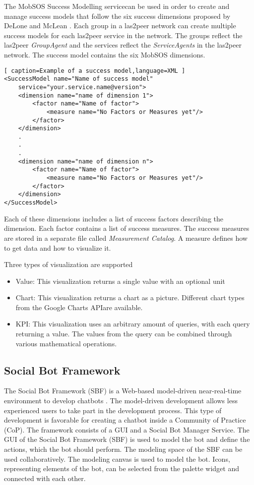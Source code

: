 The MobSOS Success Modelling service\footnotemark can be used in order to create and manage success models that follow the six success dimensions proposed by DeLone and McLean \cite{DeMc92}.
Each group in a las2peer network can create multiple success models for each las2peer service in the network. 
The groups reflect the las2peer \emph{GroupAgent} and the services reflect the \emph{ServiceAgents} in the las2peer network.
The success model contains the six MobSOS dimensions.
\begin{lstlisting}[ caption=Example of a success model,language=XML ]
<SuccessModel name="Name of success model" 
    service="your.service.name@version">
    <dimension name="name of dimension 1">
        <factor name="Name of factor">
            <measure name="No Factors or Measures yet"/>
        </factor>
    </dimension>
    .
    .
    .
    <dimension name="name of dimension n">
        <factor name="Name of factor">
            <measure name="No Factors or Measures yet"/>
        </factor>
    </dimension>
</SuccessModel>
\end{lstlisting}
Each of these dimensions includes a list of success factors describing the dimension.
Each factor contains a list of success measures. The success measures are stored in a separate file called \emph{Measurement Catalog}. A measure defines how to get data and how to visualize it. 

Three types of visualization are supported
\begin{itemize}
    \item Value: This visualization returns a single value with an optional unit
    \item Chart: This visualization returns a chart as a picture. Different chart types from the Google Charts API\footnotemark are available.
    \item KPI: This visualization uses an arbitrary amount of queries, with each query returning a value. The values from the query can be combined through various mathematical operations.
\end{itemize}


\subsection{Social Bot Framework}
The Social Bot Framework (SBF) is a Web-based model-driven near-real-time environment to develop chatbots \cite{NLKl19}. 
The model-driven development allows less experienced users to take part in the development process. This type of development is favorable for creating a chatbot inside a Community of Practice (CoP). 
The framework consists of a GUI and a Social Bot Manager Service.
The GUI of the Social Bot Framework (SBF) is used to model the bot and define the actions, which the bot should perform. 
The modeling space of the SBF can be used collaboratively. The modeling canvas is used to model the bot. Icons, representing elements of the bot, can be selected from the palette widget and connected with each other. 

